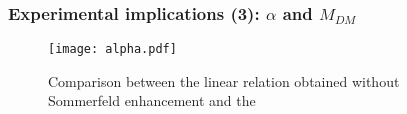 \documentclass{beamer}
\begin{document}
\begin{frame}
\frametitle{Experimental implications (3): \(\alpha \) and \(M_{DM} \)}
\begin{figure}[htbp]
	\centering
	\texttt{[image: alpha.pdf]}
	\caption{Comparison between the linear relation obtained without Sommerfeld enhancement and the }
	\label{fig:}
\end{figure}
\end{frame}
\end{document}
